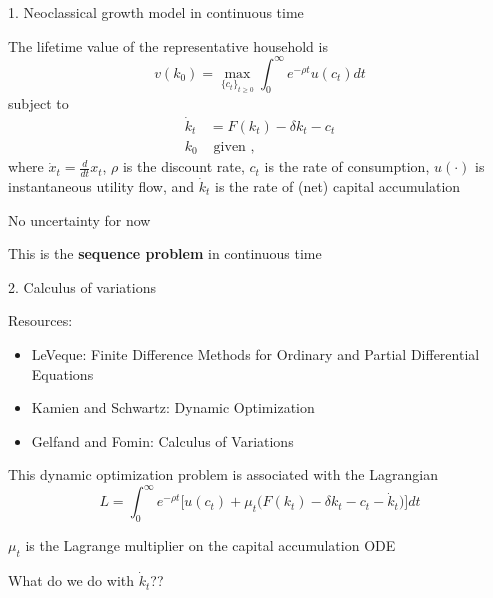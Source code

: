 \documentclass[11pt, aspectratio=169]{beamer}
\newenvironment{witemize}{\itemize\addtolength{\itemsep}{10pt}}{\enditemize}
\begin{document}
\begin{frame}{1. Neoclassical growth model in continuous time}
\begin{witemize}
\item The lifetime value of the representative household is
\begin{equation*}
	v(k_0) = \max_{\{ c_t \}_{t \geq 0} } \int_0^\infty e^{-\rho t} u(c_t) dt
\end{equation*}
subject to
\begin{align*}
	\dot k_t &= F(k_t) - \delta k_t - c_t \\
	k_0 &\text{ given },
\end{align*}
where $\dot x_t = \frac{d}{dt} x_t$, $\rho$ is the discount rate, $c_t$ is the rate of consumption, $u(\cdot)$ is instantaneous utility flow, and $\dot k_t$ is the rate of (net) capital accumulation

\item No uncertainty for now

\item This is the \textbf{sequence problem} in continuous time
\end{witemize}
\end{frame}


\begin{frame}{2. Calculus of variations} 
\begin{witemize}
\item Resources:
\begin{itemize}
	\item LeVeque: Finite Difference Methods for Ordinary and Partial Differential Equations
	
	\item Kamien and Schwartz: Dynamic Optimization
	
	\item Gelfand and Fomin: Calculus of Variations
\end{itemize}

\item This dynamic optimization problem is associated with the Lagrangian
\begin{equation*}
	L = \int_0^\infty e^{-\rho t} \bigg[ u(c_t) + \mu_t \bigg( F(k_t) - \delta k_t - c_t - \dot k_t \bigg) \bigg] dt 
\end{equation*}

\item $\mu_t$ is the Lagrange multiplier on the capital accumulation ODE

\item What do we do with $\dot k_t$??

\end{witemize}
\end{frame}
\end{document}
